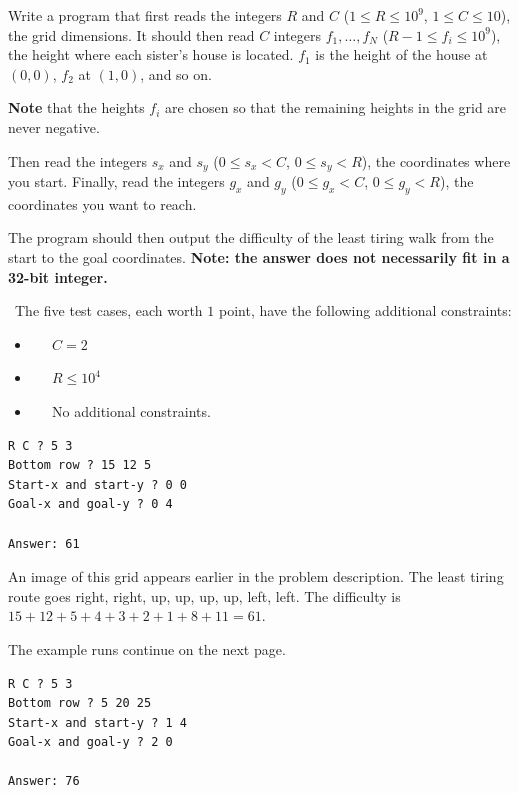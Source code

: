 Write a program that first reads the integers $R$ and $C$ ($1 \leq R \leq 10^9$, $1 \leq C \leq 10$),
the grid dimensions.
It should then read $C$ integers $f_1, \dots, f_N$ ($R-1 \leq f_i \leq 10^9$),
the height where each sister's house is located.
$f_1$ is the height of the house at $(0,0)$, $f_2$ at $(1,0)$, and so on.

\textbf{Note} that the heights $f_i$ are chosen so that the remaining heights in the grid are never negative.

Then read the integers $s_x$ and $s_y$ ($0 \leq s_x < C$, $0 \leq s_y < R$),
the coordinates where you start.
Finally, read the integers $g_x$ and $g_y$ ($0 \leq g_x < C$, $0 \leq g_y < R$),
the coordinates you want to reach.

The program should then output the difficulty of the least tiring walk from the start to the goal coordinates.
\textbf{Note: the answer does not necessarily fit in a 32-bit integer.}

\
The five test cases, each worth $1$ point, have the following additional constraints:
\begin{itemize}
\item[(1)] $\;\;\;\;$ $C=2$
\item[(2-3)] $\;\;\;\;$ $R \leq 10^4$
\item[(4-5)] $\;\;\;\;$ No additional constraints.
\end{itemize}

\vspace{0.6cm}

\begin{verbatim}
R C ? 5 3
Bottom row ? 15 12 5
Start-x and start-y ? 0 0
Goal-x and goal-y ? 0 4

Answer: 61
\end{verbatim}

 An image of this grid appears earlier in the problem description.
The least tiring route goes right, right, up, up, up, up, left, left.
The difficulty is $15+12+5+4+3+2+1+8+11=61$.

\vspace{1cm}

\begin{center}
{\LARGE The example runs continue on the next page.}
\end{center}

\newpage

\begin{verbatim}
R C ? 5 3
Bottom row ? 5 20 25
Start-x and start-y ? 1 4
Goal-x and goal-y ? 2 0

Answer: 76
\end{verbatim}


